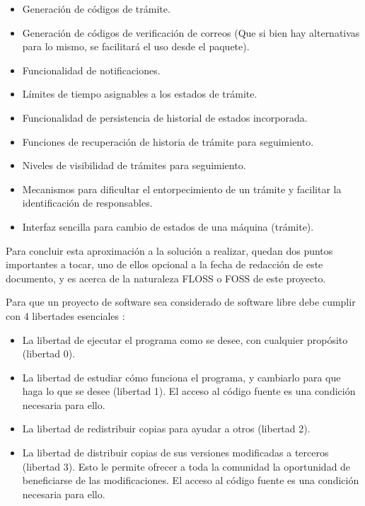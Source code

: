 \begin{itemize}
	\item Generación de códigos de trámite.

	\item Generación de códigos de verificación de correos (Que si bien hay
		alternativas para lo mismo, se facilitará el uso desde el paquete).

	\item Funcionalidad de notificaciones.

	\item Límites de tiempo asignables a los estados de trámite.

	\item Funcionalidad de persistencia de historial de estados incorporada.

	\item Funciones de recuperación de historia de trámite para seguimiento.

	\item Niveles de visibilidad de trámites para seguimiento.

	\item Mecanismos para dificultar el entorpecimiento de un trámite y
		facilitar la identificación de responsables.

	\item Interfaz sencilla para cambio de estados de una máquina (trámite).
\end{itemize}

Para concluir esta aproximación a la solución a realizar, quedan dos puntos
importantes a tocar, uno de ellos opcional a la fecha de redacción de este
documento, y es acerca de la naturaleza FLOSS o FOSS de este proyecto.

Para que un proyecto de software sea considerado de software libre debe cumplir
con 4 libertades esenciales \cite{QueEsSoftware}:

\begin{itemize}
	\item La libertad de ejecutar el programa como se desee, con cualquier
		propósito (libertad 0).
	
	\item La libertad de estudiar cómo funciona el programa, y cambiarlo para
		que haga lo que se desee (libertad 1). El acceso al código fuente es una
		condición necesaria para ello.
	
	\item La libertad de redistribuir copias para ayudar a otros (libertad 2).
	
	\item La libertad de distribuir copias de sus versiones modificadas a
		terceros (libertad 3). Esto le permite ofrecer a toda la comunidad la
		oportunidad de beneficiarse de las modificaciones. El acceso al código
		fuente es una condición necesaria para ello.
\end{itemize}

